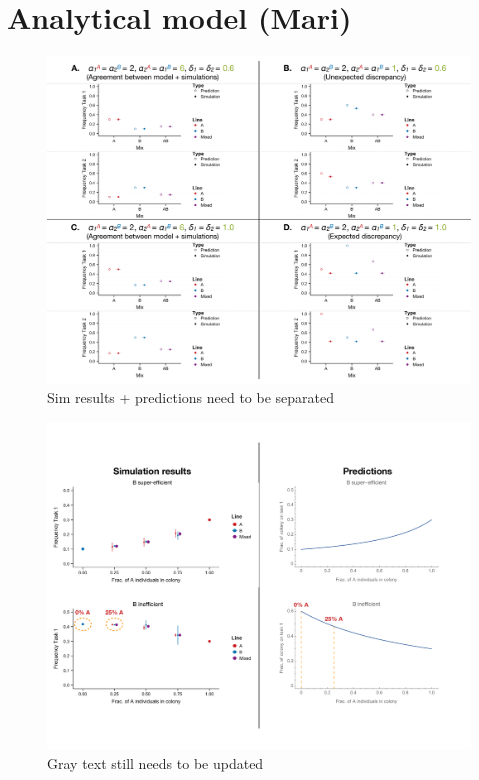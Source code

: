 \documentclass[11pt]{article}
\begin{document}
\section{Analytical model (Mari)}
\begin{figure}[H]
    \centering
    \includegraphics[trim={0 0.25in 0 0.2in}, clip, width=0.9\linewidth]{5050_comparison.pdf}
    \caption{Sim results + predictions need to be separated}
    \label{fig:5050comp}
\end{figure}

\begin{figure}[H]
    \centering
    \includegraphics[trim={0 1in 0 1.1in},clip,width=0.9\linewidth]{mixes_comparison.pdf}
    \caption{Gray text still needs to be updated}
    \label{fig:mixescomp}
\end{figure}
\end{document}
